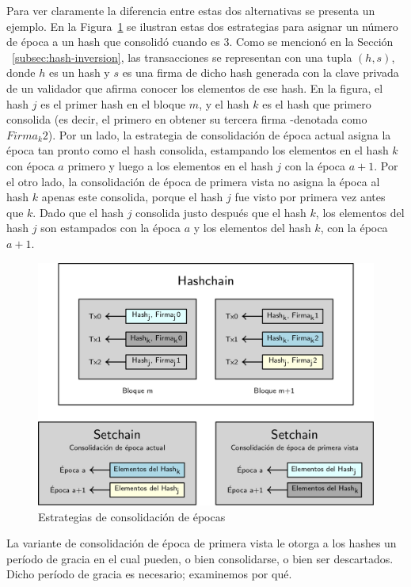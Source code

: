 %
Para ver claramente la diferencia entre estas dos alternativas se presenta un ejemplo.
%
En la Figura~\ref{fig:consolidation_epoch} se ilustran estas dos estrategias para asignar
un número de época a un hash que consolidó cuando \SPH es 3.
%
Como se mencionó en la Sección ~\ref{subsec:hash-inversion}, las transacciones se representan
con una tupla $(h, s)$, donde $h$ es un hash y $s$ es una firma de dicho hash generada con la
clave privada de un validador que afirma conocer los elementos de ese hash.
%
En la figura, el hash $j$ es el primer hash en el bloque $m$, y el hash $k$ es el hash que primero consolida
(es decir, el primero en obtener su tercera firma -denotada como $Firma_{k}2$).
%
Por un lado, la estrategia de consolidación de época actual asigna la época tan pronto como
el hash consolida, estampando los elementos en el hash $k$ con época $a$ primero y luego
a los elementos en el hash $j$ con la época $a+1$.
%
Por el otro lado, la consolidación de época de primera vista no asigna la época al hash $k$
apenas este consolida, porque el hash $j$ fue visto por primera vez antes que $k$.
%
Dado que el hash $j$ consolida justo después que el hash $k$, los elementos del hash $j$ son
estampados
con la época $a$ y los elementos del hash $k$, con la época $a+1$. 

\begin{figure}
  \centering
  \includegraphics[scale=0.28]{figures/consolidation-example.png}
  \caption{Estrategias de consolidación de épocas}
  \label{fig:consolidation_epoch}
\end{figure}

La variante de consolidación de época de primera vista le otorga a los hashes un período
de gracia en el cual pueden, o bien consolidarse, o bien ser descartados.
%
Dicho período de gracia es necesario; examinemos por qué.


